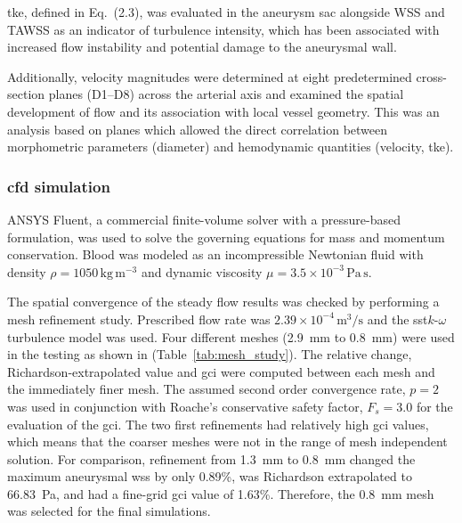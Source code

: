\documentclass[12pt,a4paper]{article}
\newcommand{\WSS}{\ac{wss}\xspace}
\newcommand{\TKE}{\ac{tke}\xspace}
\newcommand{\SST}{\ac{sst}\xspace}
\newcommand{\GCI}{\ac{gci}\xspace}
\newcommand{\CFDcap}{\Ac{cfd}\xspace}
\newcommand{\TKEcap}{\Ac{tke}\xspace}
\theoremstyle{definition}
\numberwithin{equation}{section}
\begin{document}
\TKEcap, defined in Eq.~(2.3), was evaluated in the aneurysm sac alongside WSS and TAWSS as an indicator of turbulence intensity, which has been associated with increased flow instability and potential damage to the aneurysmal wall.

Additionally, velocity magnitudes were determined at eight predetermined cross-section planes (D1--D8) across the arterial axis and examined the spatial development of flow and its association with local vessel geometry. This was an analysis based on planes which allowed the direct correlation between morphometric parameters (diameter) and hemodynamic quantities (velocity, \TKE).




\subsubsection{\label{CFD Simulation}\texorpdfstring{\CFDcap}{CFD} simulation}ANSYS Fluent, a commercial finite-volume solver with a pressure-based formulation, was used to solve the governing equations for mass and momentum conservation. Blood was modeled as an incompressible Newtonian fluid with density \(\rho = 1050\,\mathrm{kg\,m^{-3}}\) and dynamic viscosity \(\mu = 3.5 \times 10^{-3}\,\mathrm{Pa\,s}\).


The spatial convergence of the steady flow results was checked by performing a mesh refinement study. Prescribed flow rate was \(2.39 \times 10^{-4} \, \mathrm{m^3/s}\) and the \SST \(k\)-\(\omega\) turbulence model was used. Four different meshes (2.9~mm to 0.8~mm) were used in the testing as shown in (Table~\ref{tab:mesh_study}). The relative change, Richardson-extrapolated value and \GCI were computed between each mesh and the immediately finer mesh. The assumed second order convergence rate, $p=2$ was used in conjunction with Roache's conservative safety factor, $F_s=3.0$ for the evaluation of the \GCI. The two first refinements had relatively high \GCI values, which means that the coarser meshes were not in the range of mesh independent solution. For comparison, refinement from 1.3~mm to 0.8~mm changed the maximum aneurysmal \WSS by only 0.89\%, was Richardson extrapolated to 66.83~Pa, and had a fine-grid \GCI value of 1.63\%. Therefore, the 0.8~mm mesh was selected for the final simulations.
\end{document}
